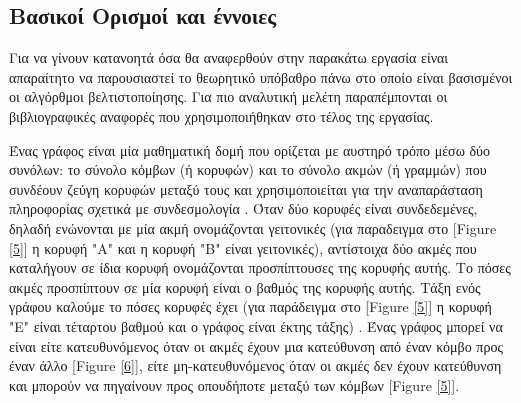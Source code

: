 \subsection{Βασικοί Ορισμοί και έννοιες}
Για να γίνουν κατανοητά όσα θα αναφερθούν στην παρακάτω εργασία είναι απαραίτητο να παρουσιαστεί το θεωρητικό υπόβαθρο πάνω στο οποίο είναι βασισμένοι οι αλγόρθμοι βελτιστοποίησης. Για πιο αναλυτική μελέτη παραπέμπονται οι βιβλιογραφικές αναφορές που χρησιμοποιήθηκαν στο τέλος της εργασίας.

Ένας γράφος είναι μία μαθηματική δομή που ορίζεται με αυστηρό τρόπο μέσω δύο συνόλων: το σύνολο κόμβων (ή κορυφών) και το σύνολο ακμών (ή γραμμών) που συνδέουν ζεύγη κορυφών μεταξύ τους και χρησιμοποιείται για την αναπαράσταση πληροφορίας σχετικά με συνδεσμολογία \cite{ntenisiwtis2023thewria}. Όταν δύο κορυφές είναι συνδεδεμένες, δηλαδή ενώνονται με μία ακμή ονομάζονται γειτονικές (για παραδειγμα στο [Figure \ref{5}] η κορυφή "Α" και η κορυφή "Β" είναι γειτονικές), αντίστοιχα δύο ακμές που καταλήγουν σε ίδια κορυφή ονομάζονται προσπίπτουσες της κορυφής αυτής. Το πόσες ακμές προσπίπτουν σε μία κορυφή είναι ο βαθμός της κορυφής αυτής. Τάξη ενός γράφου καλούμε το πόσες κορυφές έχει (για παράδειγμα στο [Figure \ref{5}] η κορυφή "Ε" είναι τέταρτου βαθμού και ο γράφος είναι έκτης τάξης) . Ένας γράφος μπορεί να είναι είτε κατευθυνόμενος όταν οι ακμές έχουν μια κατεύθυνση από έναν κόμβο προς έναν άλλο [Figure \ref{6}], είτε μη-κατευθυνόμενος όταν οι ακμές δεν έχουν κατεύθυνση και μπορούν να πηγαίνουν προς οπουδήποτε μεταξύ των κόμβων [Figure \ref{5}]. 

